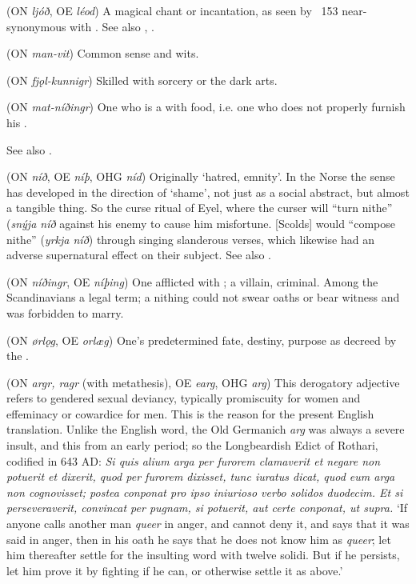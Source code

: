 \begin{itemize}
 (ON \emph{ljóð}, OE \emph{léod})
  A magical chant or incantation, as seen by \Havamal\ 153 near-synonymous with .  See also , .

 (ON \emph{man-vit})
  Common sense and wits.

 (ON \emph{fjǫl-kunnigr})
  Skilled with sorcery or the dark arts.

 (ON \emph{mat-níðingr})
  One who is a  with food, i.e. one who does not properly furnish his .

  See also .

 (ON \emph{níð}, OE \emph{níþ}, OHG \emph{níd})
  Originally ‘hatred, emnity’.  In the Norse the sense has developed in the direction of ‘shame’, not just as a social abstract, but almost a tangible thing.  So the curse ritual of Eyel, where the curser will “turn nithe” (\emph{snýja níð} against his enemy to cause him misfortune.  [Scolds] would “compose nithe” (\emph{yrkja níð}) through singing slanderous verses, which likewise had an adverse supernatural effect on their subject.  See also .

 (ON \emph{níðingr}, OE \emph{níþing})
  One afflicted with ; a villain, criminal.  Among the Scandinavians a legal term; a nithing could not swear oaths or bear witness and was forbidden to marry.

 (ON \emph{ørlǫg}, OE \emph{orlæg})
  One’s predetermined fate, destiny, purpose as decreed by the .

 (ON \emph{argr, ragr} (with metathesis), OE \emph{earg}, OHG \emph{arg})
  This derogatory adjective refers to gendered sexual deviancy, typically promiscuity for women and effeminacy or cowardice for men.  This is the reason for the present English translation.  Unlike the English word, the Old Germanich \emph{arg} was always a severe insult, and this from an early period; so the Longbeardish Edict of Rothari, codified in 643 AD: \emph{Si quis alium \emph{arga} per furorem clamaverit et negare non potuerit et dixerit, quod per furorem dixisset, tunc iuratus dicat, quod eum \emph{arga} non cognovisset; postea conponat pro ipso iniurioso verbo solidos duodecim. Et si perseveraverit, convincat per pugnam, si potuerit, aut certe conponat, ut supra.} ‘If anyone calls another man \emph{queer} in anger, and cannot deny it, and says that it was said in anger, then in his oath he says that he does not know him as \emph{queer}; let him thereafter settle for the insulting word with twelve solidi.  But if he persists, let him prove it by fighting if he can, or otherwise settle it as above.’


\end{itemize}
